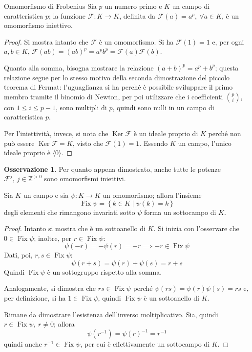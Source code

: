 \documentclass[11pt, a4paper]{scrartcl}
\theoremstyle{definition}
\numberwithin{esempio}{section}
\theoremstyle{definition}
\newtheorem{obs}{Osservazione}
\numberwithin{obs}{section}
\numberwithin{nota}{section}
\numberwithin{equation}{subsection}
\begin{document}
\begin{teorema}
	{Omomorfismo di Frobenius}{}
	Sia $p$ un numero primo e $K$ un campo di caratteristica $p$; la funzione $\mathcal{F} : K \to K$, definita da $\mathcal{F} (a) = a^p, \ \forall a \in K$, \`e un omomorfismo iniettivo.
	\begin{proof}
		Si mostra intanto che $\mathcal{F} $ \`e un omomorfismo.
		Si ha $\mathcal{F} (1) = 1$ e, per ogni $a,b \in K$, $\mathcal{F} (ab) = (ab)^p = a^p b^p = \mathcal{F} (a) \mathcal{F} (b)$.

		Quanto alla somma, bisogna mostrare la relazione $(a+b)^p = a^p + b^p$; questa relazione segue per lo stesso motivo della seconda dimostrazione del piccolo teorema di Fermat: l'uguaglianza si ha perch\'e \`e possibile sviluppare il primo membro tramite il binomio di Newton, per poi utilizzare che i coefficienti $\binom{p}{i}$, con $1 \le i\le p-1$, sono multipli di $p$, quindi sono nulli in un campo di caratteristica $p$.

		Per l'iniettivit\`a, invece, si nota che $\operatorname{Ker} \mathcal{F} $ \`e un ideale proprio di $K$ perch\'e non pu\`o essere $\operatorname{Ker} \mathcal{F} = K$, visto che $\mathcal{F} (1) = 1$.
		Essendo $K$ un campo, l'unico ideale proprio \`e $\langle 0 \rangle$.
	\end{proof}
\end{teorema}
\begin{obs}
	Per quanto appena dimostrato, anche tutte le potenze $\mathcal{F} ^j, \ j \in \mathbb{Z}^{>0} $ sono omomorfismi iniettivi.
\end{obs}
\begin{teorema}
	{}{}
	Sia $K$ un campo e sia $\psi :K \to K$ un omomorfismo; allora l'insieme
	\[
\operatorname{Fix} \psi = \left\{ k \in K  \mid \psi (k) = k \right\} 
	\] 
	degli elementi che rimangono invariati sotto $\psi $ forma un sottocampo di $K$.
	\begin{proof}
		Intanto si mostra che \`e un sottoanello di $K$. 
		Si inizia con l'osservare che $0 \in \operatorname{Fix} \psi $; inoltre, per $r \in \operatorname{Fix} \psi $:
		\[
		\psi (-r) = -\psi (r) = -r\implies -r \in \operatorname{Fix} \psi 
		\] 
		Dati, poi, $r,s \in \operatorname{Fix} \psi $:
		\[
		\psi (r+s) = \psi (r) + \psi (s) = r + s
		\] 
		Quindi $\operatorname{Fix} \psi $ \`e un sottogruppo rispetto alla somma.

		Analogamente, si dimostra che $rs \in \operatorname{Fix} \psi $ perch\'e $\psi (rs) = \psi (r) \psi (s) = rs$ e, per definizione, si ha $1 \in \operatorname{Fix} \psi $, quindi $\operatorname{Fix} \psi $ \`e un sottoanello di $K$.

		Rimane da dimostrare l'esistenza dell'inverso moltiplicativo. Sia, quindi $r \in \operatorname{Fix} \psi , \ r \neq 0 $; allora
		\[
		\psi (r^{-1} ) = \psi (r)^{-1} = r^{-1} 
		\] 
		quindi anche $r ^{-1 } \in \operatorname{Fix} \psi $, per cui \`e effettivamente un sottocampo di $K$.
	\end{proof}
\end{teorema}
\end{document}
